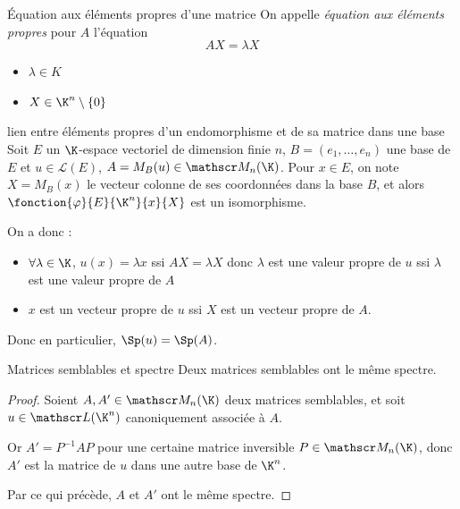 \begin{definition}{Équation aux éléments propres d'une matrice}{}
    On appelle \emph{équation aux éléments propres} pour $A$ l'équation 
    $$AX = \lambda X$$

    \begin{itemize}
        \item $\lambda \in K$
        \item $X \in \K^n \setminus \{0\}$
    \end{itemize}
    
\end{definition}

\begin{propositionnt}{lien entre éléments propres d'un endomorphisme et de sa matrice dans une base}{}
    Soit $E$ un $\K$-espace vectoriel de dimension finie $n$, 
    $B = (e_1, \ldots, e_n)$ une base de $E$ et $u \in \mathscr L(E)$, 
    $A = M_B(u) \in \mathscr M_n(\K)$. 
    Pour $x \in E$, on note $X = M_B(x)$ le vecteur colonne de ses coordonnées dans la base $B$, et alors 
    $\fonction{\varphi}{E}{\K^n}{x}{X}$ est un isomorphisme. 
    
    On a donc : 
    \begin{itemize}
        \item $\forall \lambda \in \K$, $u(x) = \lambda x$ ssi $AX = \lambda X$ donc $\lambda$ est une valeur propre de $u$
        ssi $\lambda$ est une valeur propre de $A$
        \item $x$ est un vecteur propre de $u$
        ssi $X$ est un vecteur propre de $A$.
    \end{itemize}
    Donc en particulier, $\Sp(u) = \Sp(A)$.
\end{propositionnt}


\begin{proposition}{Matrices semblables et spectre}{}
    Deux matrices semblables ont le même spectre.
\end{proposition}


\begin{proof}
    Soient $A, A' \in \mathscr M_n(\K)$ deux matrices semblables, et 
    soit $u \in \mathscr L(\K^n)$ canoniquement associée à $A$. 

    Or $A' = P^{-1} A P$ pour une certaine matrice inversible $P \in \mathscr M_n(\K)$, 
    donc $A'$ est la matrice de $u$ dans une autre base de $\K^n$.

    Par ce qui précède, $A$ et $A'$ ont le même spectre.
\end{proof}

